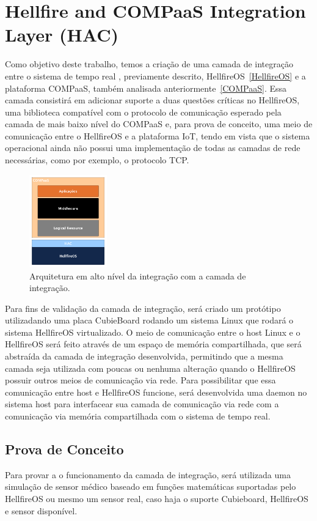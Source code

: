 \section{Hellfire and COMPaaS Integration Layer (HAC)}
\label{sec:HAC}
Como objetivo deste trabalho, temos a criação de uma camada de integração entre o sistema de tempo real
, previamente descrito, HellfireOS~\ref{HellfireOS} e a plataforma COMPaaS, também analisada anteriormente~\ref{COMPaaS}.
Essa camada consistirá em adicionar suporte a duas questões críticas no HellfireOS, uma biblioteca compatível
com o protocolo de comunicação esperado pela camada de mais baixo nível do COMPaaS e, para prova de conceito,
uma meio de comunicação entre o HellfireOS e a plataforma IoT, tendo em vista que o sistema operacional
ainda não possui uma implementação de todas as camadas de rede necessárias, como por exemplo, o protocolo
TCP.

\begin{figure}[H]
	\centering
		\includegraphics[width=0.3\textwidth]{fig/COMPaaS_HF.png}
	\caption{Arquitetura em alto nível da integração com a camada de integração.}
\end{figure}

Para fins de validação da camada de integração, será criado um protótipo utilizadando uma placa
CubieBoard rodando um sistema Linux que rodará o sistema HellfireOS virtualizado. O meio de comunicação
entre o host Linux e o HellfireOS será feito através de um espaço de memória compartilhada, que será
abstraída da camada de integração desenvolvida, permitindo que a mesma camada seja utilizada com
poucas ou nenhuma alteração quando o HellfireOS possuir outros meios de comunicação via rede.
Para possibilitar que essa comunicação entre host e HellfireOS funcione, será desenvolvida uma
daemon no sistema host para interfacear sua camada de comunicação via rede com a comunicação
via memória compartilhada com o sistema de tempo real.

\subsection{Prova de Conceito}
Para provar a o funcionamento da camada de integração, será utilizada uma
simulação de sensor médico baseado em funções matemáticas suportadas pelo HellfireOS
ou mesmo um sensor real, caso haja o suporte Cubieboard, HellfireOS e sensor disponível.
